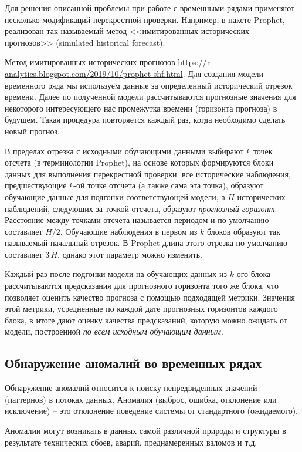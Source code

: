 \documentclass[%
	11pt,
	a4paper,
	utf8,
		]{article}
\begin{document}
Для решения описанной проблемы при работе с временными рядами применяют несколько модификаций перекрестной проверки. Например, в пакете Prophet, реализован так называемый метод <<имитированных исторических прогнозов>> (simulated historical forecast).

Метод имитированных исторических прогнозов \url{https://r-analytics.blogspot.com/2019/10/prophet-shf.html}. Для создания модели временного ряда мы используем данные за определенный исторический отрезок времени. Далее по полученной модели рассчитываются прогнозные значения для некоторого интересующего нас промежутка времени (горизонта прогноза) в будущем. Такая процедура повторяется каждый раз, когда необходимо сделать новый прогноз.

В пределах отрезка с исходными обучающими данными выбирают $ k $ точек отсчета (в терминологии Prophet), на основе которых формируются блоки данных для выполнения перекрестной проверки: все исторические наблюдения, предшествующие $ k $-ой точке отсчета (а также сама эта точка), образуют обучающие данные для подгонки соответствующей модели, а $ H $ исторических наблюдений, следующих за точкой отсчета, образуют \emph{прогнозный горизонт}. Расстояние между точками отсчета называется периодом и по умолчанию составляет $ H/2 $. Обучающие наблюдения в первом из $ k $ блоков образуют так называемый начальный отрезок. В Prophet длина этого отрезка по умолчанию составляет $ 3\,H $, однако этот параметр можно изменить.

Каждый раз после подгонки модели на обучающих данных из $ k $-ого блока рассчитываются предсказания для прогнозного горизонта того же блока, что позволяет оценить качество прогноза с помощью подходящей метрики. Значения этой метрики, усредненные по каждой дате прогнозных горизонтов каждого блока, в итоге дают оценку качества предсказаний, которую можно ожидать от модели, построенной \emph{по всем исходным обучающим данным}.

\subsection{Обнаружение аномалий во временных рядах}

Обнаружение аномалий относится к поиску непредвиденных значений (паттернов) в потоках данных. Аномалия (выброс, ошибка, отклонение или исключение) -- это отклонение поведение системы от стандартного (ожидаемого).

Аномалии могут возникать в данных самой различной природы и структуры в результате технических сбоев, аварий, преднамеренных взломов и т.д.
\end{document}
